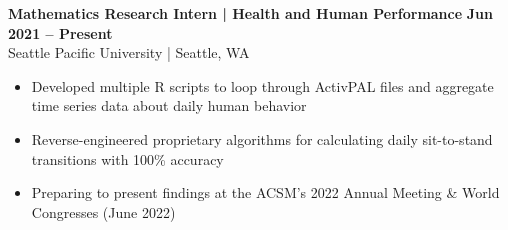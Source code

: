 \textbf{Mathematics Research Intern | Health and Human Performance} \hfill \textbf{Jun 2021 -- Present}\\
    Seattle Pacific University | Seattle, WA
    \squish
    \begin{itemize}
        \item Developed multiple R scripts to loop through ActivPAL files and aggregate time series data about daily human behavior
        \item Reverse-engineered proprietary algorithms for calculating daily sit-to-stand transitions with 100\% accuracy
        \item Preparing to present findings at the ACSM's 2022 Annual Meeting \& World Congresses (June 2022)
    \end{itemize}